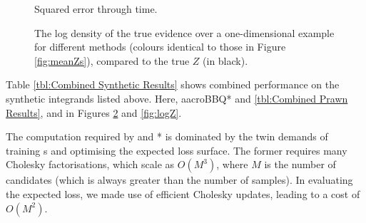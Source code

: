 \documentclass{article}
\begin{document}
% 
% 
% 
% 

\begin{figure}
	\caption{Squared error through time.}
\label{fig:nll}
\end{figure}

\begin{figure}
	\centering
	\caption{The log density of the true evidence over a one-dimensional example for different methods (colours identical to those in Figure \ref{fig:meanZs}), compared to the true $Z$ (in black).}
\label{fig:nll}
\end{figure}





Table \ref{tbl:Combined Synthetic Results} shows combined performance on the synthetic integrands listed above.  Here, aacro{BBQ*} and \ref{tbl:Combined Prawn Results}, and in Figures \ref{fig:nll} and \ref{fig:logZ}.

The computation required by  and * is dominated by the twin demands of training \gp s and optimising the expected loss surface. The former requires many Cholesky factorisations, which scale as $O(M^3)$, where $M$ is the number of candidates (which is always greater than the number of samples). In evaluating the expected loss, we made use of efficient Cholesky updates, leading to a cost of $O(M^2)$.
\end{document}
